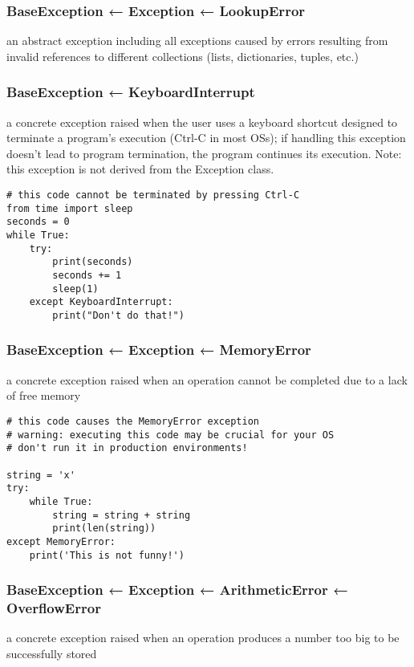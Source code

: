 \documentclass[11pt]{article}
\begin{document}
\subsubsection{BaseException ← Exception ← LookupError}
\label{sec:org41727b4}
an abstract exception including all exceptions caused by errors
resulting from invalid references to different collections (lists,
dictionaries, tuples, etc.)

\subsubsection{BaseException ← KeyboardInterrupt}
\label{sec:orgbe77020}
a concrete exception raised when the user uses a keyboard shortcut
designed to terminate a program’s execution (Ctrl-C in most OSs); if
handling this exception doesn’t lead to program termination, the
program continues its execution. Note: this exception is not derived
from the Exception class.

\begin{verbatim}
# this code cannot be terminated by pressing Ctrl-C
from time import sleep
seconds = 0
while True:
    try:
        print(seconds)
        seconds += 1
        sleep(1)
    except KeyboardInterrupt:
        print("Don't do that!")
\end{verbatim}

\subsubsection{BaseException ← Exception ← MemoryError}
\label{sec:org4123829}
a concrete exception raised when an operation cannot be completed due
to a lack of free memory

\begin{verbatim}
# this code causes the MemoryError exception
# warning: executing this code may be crucial for your OS
# don't run it in production environments!

string = 'x'
try:
    while True:
        string = string + string
        print(len(string))
except MemoryError:
    print('This is not funny!')
\end{verbatim}

\subsubsection{BaseException ← Exception ← ArithmeticError ← OverflowError}
\label{sec:org007574c}
a concrete exception raised when an operation produces a number too
big to be successfully stored
\end{document}
